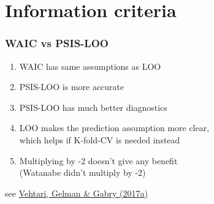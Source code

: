 \documentclass[10pt]{beamer}
\begin{document}










\section{Information criteria}
\frame{\sectionpage}




\begin{frame}{}

\frametitle{ WAIC vs PSIS-LOO}

\begin{enumerate}
  \item<2-> WAIC has same assumptions as LOO
  \item<3-> PSIS-LOO is more accurate
  \item<4-> PSIS-LOO has much better diagnostics
  \item<5-> LOO makes the prediction assumption more clear,\\ which
    helps if K-fold-CV is needed instead
  \item<6-> Multiplying by -2 doesn't give any benefit\\ (Watanabe
    didn't multiply by -2)
\end{enumerate}

\vspace{6\baselineskip}
{\small see \href{http://link.springer.com/article/10.1007/s11222-016-9696-4}{Vehtari, Gelman \& Gabry (2017a)}}
\end{frame}
\end{document}
